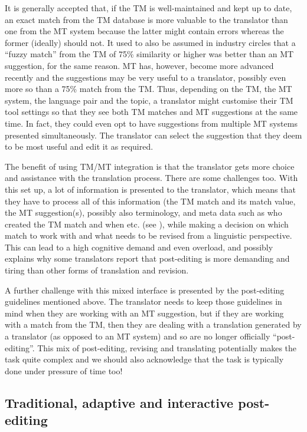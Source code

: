\documentclass[output=paper,colorlinks,citecolor=brown]{langscibook}
\begin{document}
It is generally accepted that, if the TM is well-maintained and kept up to date, an exact match from the TM database is more valuable to the translator than one from the MT system because the latter might contain errors whereas the former (ideally) should not. It used to also be assumed in industry circles that a “fuzzy match” from the TM of 75\% similarity or higher was better than an MT suggestion, for the same reason. MT has, however, become more advanced recently and the suggestions may be very useful to a translator, possibly even more so than a 75\% match from the TM. Thus, depending on the TM, the MT system, the language pair and the topic, a translator might customise their TM tool settings so that they see both TM matches and MT suggestions at the same time. In fact, they could even opt to have suggestions from multiple MT systems presented simultaneously. The translator can select the suggestion that they deem to be most useful and edit it as required.

The benefit of using TM/MT integration is that the translator gets more choice and assistance with the translation process. There are some challenges too. With this set up, a lot of information is presented to the translator, which means that they have to process all of this information (the TM match and its match value, the MT suggestion(s), possibly also terminology, and meta data such as who created the TM match and when etc. (see \citealt{TeixeiraOBrien2017}), while making a decision on which match to work with and what needs to be revised from a linguistic perspective. This can lead to a high cognitive demand and even overload, and possibly explains why some translators report that post-editing is more demanding and tiring than other forms of translation and revision.

A further challenge with this mixed interface is presented by the post-editing guidelines mentioned above. The translator needs to keep those guidelines in mind when they are working with an MT suggestion, but if they are working with a match from the TM, then they are dealing with a translation generated by a translator (as opposed to an MT system) and so are no longer officially “post-editing”. This mix of post-editing, revising and translating potentially makes the task quite complex and we should also acknowledge that the task is typically done under pressure of time too!

\subsection{Traditional, adaptive and interactive post-editing}\label{sec:obrien:3.1}
\end{document}
